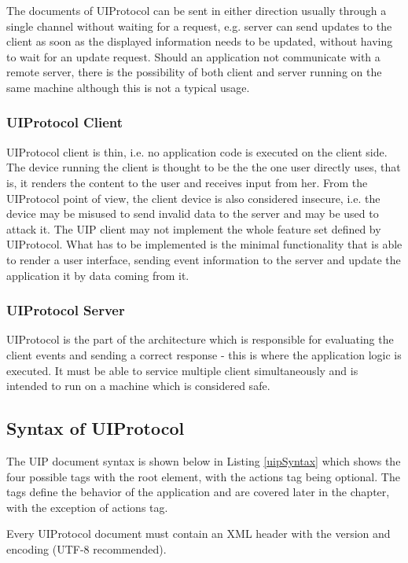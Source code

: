 The documents of UIProtocol can be sent in either direction usually through a single channel without waiting for a request, e.g. server can send updates to the client as soon as the displayed information needs to be updated, without having to wait for an update request. Should an application not communicate with a remote server, there is the possibility of both client and server running on the same machine although this is not a typical usage.

\subsubsection{UIProtocol Client}
UIProtocol client is thin, i.e. no application code is executed on the client side. The device running the client is thought to be the the one user directly uses, that is, it renders the content to the user and receives input from her. From the UIProtocol point of view, the client device is also considered insecure, i.e. the device may be misused to send invalid data to the server and may be used to attack it. The UIP client may not implement the whole feature set defined by UIProtocol. What has to be implemented is the minimal functionality that is able to render a user interface, sending event information to the server and update the application it by data coming from it.

\subsubsection{UIProtocol Server}
UIProtocol is the part of the architecture which is responsible for evaluating the client events and sending a correct response - this is where the application logic is executed. It must be able to service multiple client simultaneously and is intended to run on a machine which is considered safe.

\subsection{Syntax of UIProtocol}
The UIP document syntax is shown below in Listing \ref{uipSyntax} which shows the four possible tags with the root element, with the actions tag being optional. The tags define the behavior of the application and are covered later in the chapter, with the exception of actions tag.



Every UIProtocol document must contain an XML header with the version and encoding (UTF-8 recommended).

